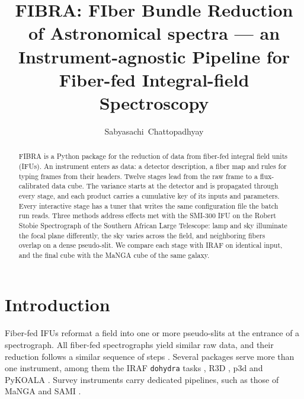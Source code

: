 \documentclass[11pt,twoside]{article}
\begin{document}
\title{FIBRA: FIber Bundle Reduction of Astronomical spectra --- an Instrument-agnostic Pipeline for Fiber-fed Integral-field Spectroscopy}

\author{Sabyasachi~Chattopadhyay}



\begin{abstract}
FIBRA is a Python package for the reduction of data from fiber-fed integral field units (IFUs). An instrument enters as data: a detector description, a fiber map and rules for typing frames from their headers. Twelve stages lead from the raw frame to a flux-calibrated data cube. The variance starts at the detector and is propagated through every stage, and each product carries a cumulative key of its inputs and parameters. Every interactive stage has a tuner that writes the same configuration file the batch run reads. Three methods address effects met with the SMI-300 IFU on the Robert Stobie Spectrograph of the Southern African Large Telescope: lamp and sky illuminate the focal plane differently, the sky varies across the field, and neighboring fibers overlap on a dense pseudo-slit. We compare each stage with IRAF on identical input, and the final cube with the MaNGA cube of the same galaxy.
\end{abstract}



\section{Introduction}

Fiber-fed IFUs reformat a field into one or more pseudo-slits at the entrance of a spectrograph. All fiber-fed spectrographs yield similar raw data, and their reduction follows a similar sequence of steps \citep{2006AN....327..850S}. Several packages serve more than one instrument, among them the IRAF \texttt{dohydra} tasks \citep{1993ASPC...52..173T}, R3D \citep{2006AN....327..850S}, p3d \citep{2010A&A...515A..35S} and PyKOALA \citep{2025arXiv250718347C}. Survey instruments carry dedicated pipelines, such as those of MaNGA \citep{2016AJ....152...83L} and SAMI \citep{2015MNRAS.446.1551S}.
\end{document}
